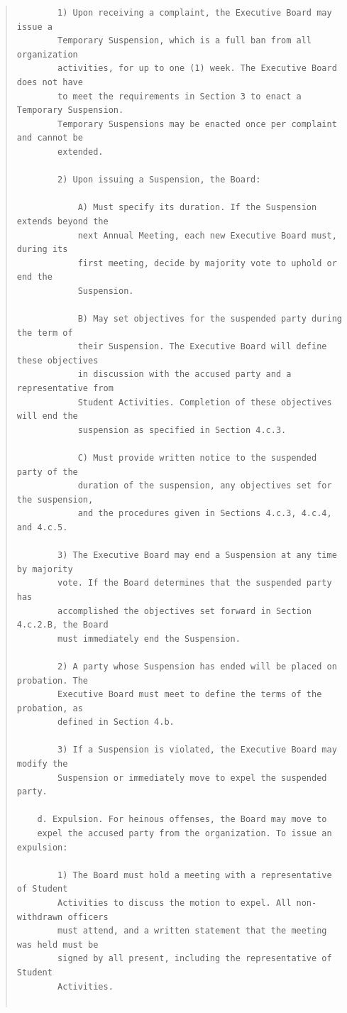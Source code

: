 \documentclass{article}
\begin{document}
\begin{quote}
\begin{verbatim}
        1) Upon receiving a complaint, the Executive Board may issue a
        Temporary Suspension, which is a full ban from all organization
        activities, for up to one (1) week. The Executive Board does not have
        to meet the requirements in Section 3 to enact a Temporary Suspension.
        Temporary Suspensions may be enacted once per complaint and cannot be
        extended.

        2) Upon issuing a Suspension, the Board:

            A) Must specify its duration. If the Suspension extends beyond the
            next Annual Meeting, each new Executive Board must, during its
            first meeting, decide by majority vote to uphold or end the
            Suspension.

            B) May set objectives for the suspended party during the term of
            their Suspension. The Executive Board will define these objectives
            in discussion with the accused party and a representative from
            Student Activities. Completion of these objectives will end the
            suspension as specified in Section 4.c.3.

            C) Must provide written notice to the suspended party of the
            duration of the suspension, any objectives set for the suspension,
            and the procedures given in Sections 4.c.3, 4.c.4, and 4.c.5.

        3) The Executive Board may end a Suspension at any time by majority
        vote. If the Board determines that the suspended party has
        accomplished the objectives set forward in Section 4.c.2.B, the Board
        must immediately end the Suspension.

        2) A party whose Suspension has ended will be placed on probation. The
        Executive Board must meet to define the terms of the probation, as
        defined in Section 4.b.

        3) If a Suspension is violated, the Executive Board may modify the
        Suspension or immediately move to expel the suspended party.

    d. Expulsion. For heinous offenses, the Board may move to
    expel the accused party from the organization. To issue an expulsion:

        1) The Board must hold a meeting with a representative of Student
        Activities to discuss the motion to expel. All non-withdrawn officers
        must attend, and a written statement that the meeting was held must be
        signed by all present, including the representative of Student
        Activities.


\end{verbatim}
\end{quote}
\end{document}
